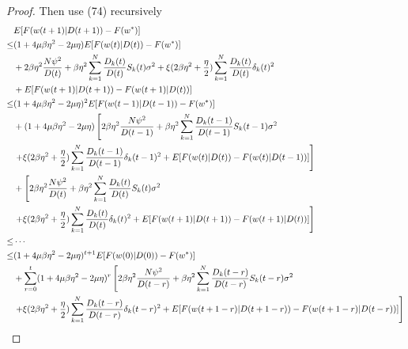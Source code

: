 \documentclass{article}
\theoremstyle{plain}
\theoremstyle{definition}
\theoremstyle{remark}
\begin{document}
\begin{proof}
  Then use (74) recursively
  \begin{align}
         & E[F(w(t+1)|D(t+1)) - F(w^*)] \notag \\
    \leq & (1+4\mu\beta\eta^2-2\mu\eta)E[F(w(t)|D(t))-F(w^*)] \notag \\
         & + 2\beta\eta^2 \frac{N\psi^2}{D(t)} + \beta\eta^2 \sum_{k=1}^{N} \frac{D_k(t)}{D(t)} S_k(t) \sigma^2 + \xi(2\beta\eta^2 + \frac{\eta}{2}) \sum_{k=1}^{N} \frac{D_k(t)}{D(t)} \delta_k(t)^2 \notag \\
         & + E[F(w(t+1)|D(t+1)) - F(w(t+1)|D(t))] \notag \\
    \leq & (1+4\mu\beta\eta^2-2\mu\eta)^2E[F(w(t-1)|D(t-1))-F(w^*)] \notag \\
         & + (1+4\mu\beta\eta^2-2\mu\eta)\left[2\beta\eta^2 \frac{N\psi^2}{D(t-1)} + \beta\eta^2 \sum_{k=1}^{N} \frac{D_k(t-1)}{D(t-1)} S_k(t-1) \sigma^2 \right. \notag \\
         & \left.  + \xi(2\beta\eta^2 + \frac{\eta}{2}) \sum_{k=1}^{N} \frac{D_k(t-1)}{D(t-1)} \delta_k(t-1)^2 + E[F(w(t)|D(t)) - F(w(t)|D(t-1))]\right] \notag \\
         & + \left[2\beta\eta^2 \frac{N\psi^2}{D(t)} + \beta\eta^2 \sum_{k=1}^{N} \frac{D_k(t)}{D(t)} S_k(t) \sigma^2 \right. \notag \\
         & \left. + \xi(2\beta\eta^2 + \frac{\eta}{2}) \sum_{k=1}^{N} \frac{D_k(t)}{D(t)} \delta_k(t)^2 + E[F(w(t+1)|D(t+1)) - F(w(t+1)|D(t))] \right] \notag \\
    \leq & \cdots \notag \\
    \leq & (1+4\mu\beta\eta^2-2\mu\eta)^{t+1}E[F(w(0)|D(0))-F(w^*)] \notag \\
         & + \sum_{r=0}^t(1+4\mu\beta\eta^2-2\mu\eta)^r \left[2\beta\eta^2 \frac{N\psi^2}{D(t-r)} + \beta\eta^2 \sum_{k=1}^{N} \frac{D_k(t-r)}{D(t-r)} S_k(t-r) \sigma^2 \right. \notag \\
         & \left. + \xi(2\beta\eta^2 + \frac{\eta}{2}) \sum_{k=1}^{N} \frac{D_k(t-r)}{D(t-r)} \delta_k(t-r)^2 + E[F(w(t+1-r)|D(t+1-r)) - F(w(t+1-r)|D(t-r))] \right]
  \end{align}


\end{proof}
\end{document}
